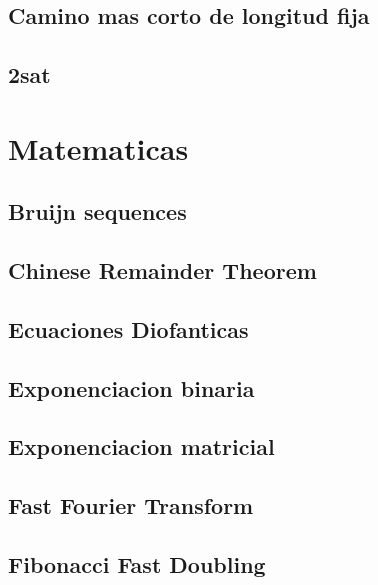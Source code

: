 \subsection{Camino mas corto de longitud fija}
\raggedbottom
\hrulefill
\subsection{2sat}
\raggedbottom
\hrulefill

\section{Matematicas}
\subsection{Bruijn sequences}
\raggedbottom
\hrulefill
\subsection{Chinese Remainder Theorem}
\raggedbottom
\hrulefill
\subsection{Ecuaciones Diofanticas}
\raggedbottom
\hrulefill
\subsection{Exponenciacion binaria}
\raggedbottom
\hrulefill
\subsection{Exponenciacion matricial}
\raggedbottom
\hrulefill
\subsection{Fast Fourier Transform}
\raggedbottom
\hrulefill
\subsection{Fibonacci Fast Doubling}
\raggedbottom
\hrulefill
